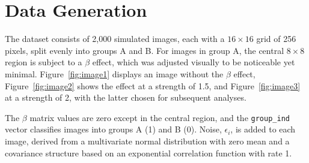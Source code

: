 \documentclass[12pt]{article}
\begin{document}
\section*{Data Generation}

The dataset consists of 2,000 simulated images, each with a \(16 \times 16\) grid of 256 pixels, split evenly into groups A and B. For images in group A, the central \(8 \times 8\) region is subject to a \(\beta\) effect, which was adjusted visually to be noticeable yet minimal. Figure~\ref{fig:image1} displays an image without the \(\beta\) effect, Figure~\ref{fig:image2} shows the effect at a strength of 1.5, and Figure~\ref{fig:image3} at a strength of 2, with the latter chosen for subsequent analyses.

The \(\beta\) matrix values are zero except in the central region, and the \texttt{group\_ind} vector classifies images into groups A (1) and B (0). Noise, \(\epsilon_i\), is added to each image, derived from a multivariate normal distribution with zero mean and a covariance structure based on an exponential correlation function with rate 1.


\end{document}
